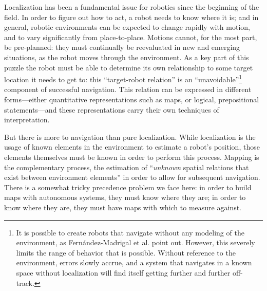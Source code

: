 Localization has been a fundamental issue for robotics since the
beginning of the field. In order to figure out how to act, a robot
needs to know where it is; and in general, robotic environments can be
expected to change rapidly with motion, and to vary significantly from
place-to-place\cite[p. 4]{???-SLAMbook}. Motions cannot, for the most part,
be pre-planned:  they must continually be reevaluated in new and
emerging situations, as the robot moves through the environment. As a
key part of this puzzle the robot must be able to determine its own
relationship to some target location it needs to get to: this
``target-robot relation'' is an ``unavoidable''\footnote{It is
  possible to create robots that navigate without any modeling of the
environment, as Fern\'{a}ndez-Madrigal et al. point out. However, this
severely limits the range of behavior that is possible. Without
reference to the environment, errors slowly accrue, and a system that
navigates in a known space without localization will find itself
getting further and further off-track.} component of successful
navigation.\cite[p. 5]{???-SLAMbook} This relation can be expressed
in different forms---either quantitative representations such as maps,
or logical, prepositional statements---and these representations carry
their own techniques of interpretation. 

But there is more to navigation than pure localization. While
localization is the usage of known elements in the environment to
estimate a robot's position, those elements themselves must be known
in order to perform this process. Mapping is the complementary
process, the estimation of ``\emph{unknown} spatial relations that
exist between environment elements'' in order to allow for subsequent
navigation\cite[p. 5]{???-SLAMbook}. There is a somewhat tricky
precedence problem we face here:  in order to build maps with
autonomous systems, they must know where they are; in order to know
where they are, they must have maps with which to measure
against.\cite[p. 6]{???-SLAMbook}

